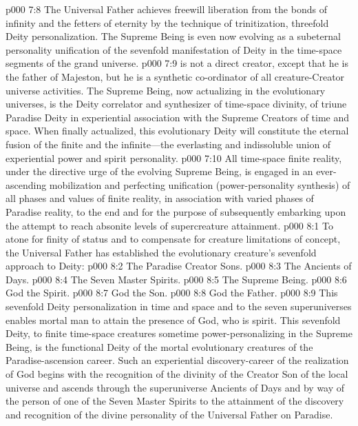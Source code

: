 \vs p000 7:8 The Universal Father achieves freewill liberation from the bonds of infinity and the fetters of eternity by the technique of trinitization, threefold Deity personalization. The Supreme Being is even now evolving as a subeternal personality unification of the sevenfold manifestation of Deity in the time\hyp{}space segments of the grand universe.\plusone
\pc \vs p000 7:9  is not a direct creator, except that he is the father of Majeston, but he is a synthetic co\hyp{}ordinator of all creature\hyp{}Creator universe activities. The Supreme Being, now actualizing in the evolutionary universes, is the Deity correlator and synthesizer of time\hyp{}space divinity, of triune Paradise Deity in experiential association with the Supreme Creators of time and space. When finally actualized, this evolutionary Deity will constitute the eternal fusion of the finite and the infinite---the everlasting and indissoluble union of experiential power and spirit personality.
\vs p000 7:10 All time\hyp{}space finite reality, under the directive urge of the evolving Supreme Being, is engaged in an ever\hyp{}ascending mobilization and perfecting unification (power\hyp{}personality synthesis) of all phases and values of finite reality, in association with varied phases of Paradise reality, to the end and for the purpose of subsequently embarking upon the attempt to reach absonite levels of supercreature attainment.
\vs p000 8:1 To atone for finity of status and to compensate for creature limitations of concept, the Universal Father has established the evolutionary creature’s sevenfold approach to Deity:
\pc \vs p000 8:2 \bibnobreakspace The Paradise Creator Sons.
\vs p000 8:3 \bibnobreakspace The Ancients of Days.
\vs p000 8:4 \bibnobreakspace The Seven Master Spirits.
\vs p000 8:5 \bibnobreakspace The Supreme Being.
\vs p000 8:6 \bibnobreakspace God the Spirit.
\vs p000 8:7 \bibnobreakspace God the Son.
\vs p000 8:8 \bibnobreakspace God the Father.
\pc \vs p000 8:9 This sevenfold Deity personalization in time and space and to the seven superuniverses enables mortal man to attain the presence of God, who is spirit. This sevenfold Deity, to finite time\hyp{}space creatures sometime power\hyp{}personalizing in the Supreme Being, is the functional Deity of the mortal evolutionary creatures of the Paradise\hyp{}ascension career. Such an experiential discovery\hyp{}career of the realization of God begins with the recognition of the divinity of the Creator Son of the local universe and ascends through the superuniverse Ancients of Days and by way of the person of one of the Seven Master Spirits to the attainment of the discovery and recognition of the divine personality of the Universal Father on Paradise.
